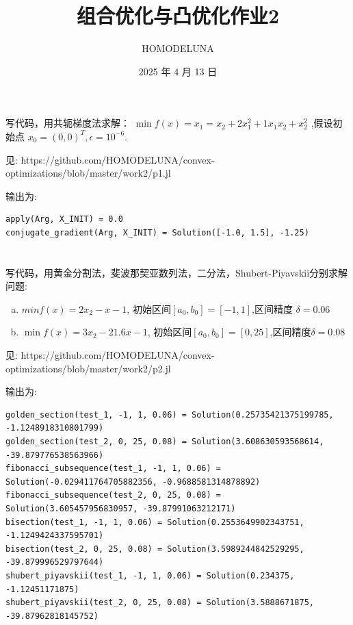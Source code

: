 \documentclass[a4paper]{article}
\title{组合优化与凸优化作业2}
\author{HOMODELUNA}
\date{2025 年 4 月 13 日}
\begin{document}
\maketitle
\section{}

写代码，用共轭梯度法求解： \(\min f(x) = x_1 = x_2 + 2x_1^2 + 1x_1x_2 + x_2^2\)
,假设初始点 $x_0 = (0,0)^T, \epsilon = 10^{-6}$.

见: https://github.com/HOMODELUNA/convex-optimizations/blob/master/work2/p1.jl

输出为:
\begin{lstlisting}
apply(Arg, X_INIT) = 0.0
conjugate_gradient(Arg, X_INIT) = Solution([-1.0, 1.5], -1.25)
\end{lstlisting}

\section{}

写代码，用黄金分割法，斐波那契亚数列法，二分法，Shubert-Piyavskii分别求解问题:

\begin{enumerate}[(a)]
    \item \(min f(x) = 2x_2 -x -1\), 初始区间\( [a_0,b_0] = [-1,1]\),区间精度 \(\delta = 0.06\)
    
    \item \(\min f(x)=3x_2 - 21.6x-1\), 初始区间\([a_0,b_0] = [0,25]\),区间精度\(\delta = 0.08\)
\end{enumerate}

见: https://github.com/HOMODELUNA/convex-optimizations/blob/master/work2/p2.jl


输出为:
\begin{lstlisting}
golden_section(test_1, -1, 1, 0.06) = Solution(0.25735421375199785, -1.1248918310801799)
golden_section(test_2, 0, 25, 0.08) = Solution(3.608630593568614, -39.879776538563966)
fibonacci_subsequence(test_1, -1, 1, 0.06) = Solution(-0.029411764705882356, -0.9688581314878892)
fibonacci_subsequence(test_2, 0, 25, 0.08) = Solution(3.605457956830957, -39.87991063212171)
bisection(test_1, -1, 1, 0.06) = Solution(0.2553649902343751, -1.1249424337595701)
bisection(test_2, 0, 25, 0.08) = Solution(3.5989244842529295, -39.879996529797644)
shubert_piyavskii(test_1, -1, 1, 0.06) = Solution(0.234375, -1.12451171875)
shubert_piyavskii(test_2, 0, 25, 0.08) = Solution(3.5888671875, -39.87962818145752)
\end{lstlisting}
\end{document}
